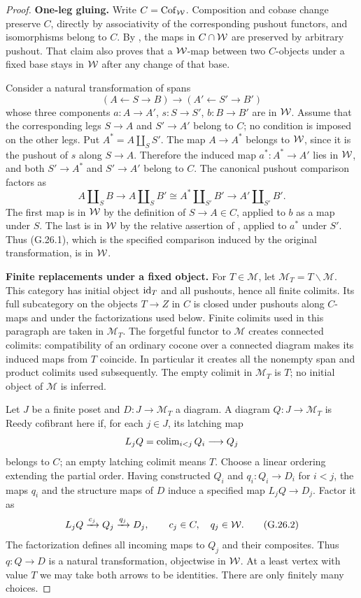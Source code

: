 \begin{proof}
\par\smallskip\noindent\textbf{One-leg gluing.}\quad
Write $C=\operatorname{Cof}_{\mathcal{W}}$. Composition and cobase change preserve $C$, directly by associativity of the corresponding pushout functors, and isomorphisms belong to $C$. By , the maps in $C\cap\mathcal{W}$ are preserved by arbitrary pushout. That claim also proves that a $\mathcal{W}$-map between two $C$-objects under a fixed base stays in $\mathcal{W}$ after any change of that base.

Consider a natural transformation of spans
\[
(A\leftarrow S\to B)\longrightarrow(A'\leftarrow S'\to B')
\]
whose three components $a:A\to A'$, $s:S\to S'$, $b:B\to B'$ are in $\mathcal{W}$. Assume that the corresponding legs $S\to A$ and $S'\to A'$ belong to $C$; no condition is imposed on the other legs. Put $A^*=A\amalg_S S'$. The map $A\to A^*$ belongs to $\mathcal{W}$, since it is the pushout of $s$ along $S\to A$. Therefore the induced map $a^*:A^*\to A'$ lies in $\mathcal{W}$, and both $S'\to A^*$ and $S'\to A'$ belong to $C$. The canonical pushout comparison factors as
\[
A\amalg_S B
\longrightarrow A\amalg_S B'
\cong A^*\amalg_{S'}B'
\longrightarrow A'\amalg_{S'}B'.
                                                        \tag{G.26.1}
\]
The first map is in $\mathcal{W}$ by the definition of $S\to A\in C$, applied to $b$ as a map under $S$. The last is in $\mathcal{W}$ by the relative assertion of , applied to $a^*$ under $S'$. Thus (G.26.1), which is the specified comparison induced by the original transformation, is in $\mathcal{W}$.

\par\smallskip\noindent\textbf{Finite replacements under a fixed object.}\quad
For $T\in\mathcal M$, let $\mathcal M_T=T\backslash\mathcal M$. This category has initial object $\mathrm{id}_T$ and all pushouts, hence all finite colimits. Its full subcategory on the objects $T\to Z$ in $C$ is closed under pushouts along $C$-maps and under the factorizations used below. Finite colimits used in this paragraph are taken in $\mathcal M_T$. The forgetful functor to $\mathcal M$ creates connected colimits: compatibility of an ordinary cocone over a connected diagram makes its induced maps from $T$ coincide. In particular it creates all the nonempty span and product colimits used subsequently. The empty colimit in $\mathcal M_T$ is $T$; no initial object of $\mathcal M$ is inferred.

Let $J$ be a finite poset and $D:J\to\mathcal M_T$ a diagram. A diagram $Q:J\to\mathcal M_T$ is Reedy cofibrant here if, for each $j\in J$, its latching map
\[
L_jQ=\operatorname{colim}_{i<j}Q_i\longrightarrow Q_j
\]
belongs to $C$; an empty latching colimit means $T$. Choose a linear ordering extending the partial order. Having constructed $Q_i$ and $q_i:Q_i\to D_i$ for $i<j$, the maps $q_i$ and the structure maps of $D$ induce a specified map $L_jQ\to D_j$. Factor it as
\[
L_jQ\xrightarrow{c_j}Q_j\xrightarrow{q_j}D_j,
\qquad c_j\in C,\quad q_j\in\mathcal{W}.                         \tag{G.26.2}
\]
The factorization defines all incoming maps to $Q_j$ and their composites. Thus $q:Q\to D$ is a natural transformation, objectwise in $\mathcal{W}$. At a least vertex with value $T$ we may take both arrows to be identities. There are only finitely many choices.


\end{proof}
